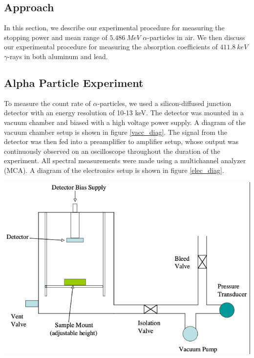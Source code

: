 \documentclass[10pt]{article}
\newenvironment{Figure}
{\par\medskip\noindent\minipage{\linewidth}}
{\endminipage\par\medskip}
\begin{document}
\begin{multicols}{2}
\section{Approach} \label{appr}
In this section, we describe our experimental procedure for measuring the stopping power and mean range of $5.486 \ MeV$ $\alpha$-particles in air.  We then discuss our experimental procedure for measuring the absorption coefficients of $411.8 \ keV$ $\gamma$-rays in both aluminum and lead. 

\subsection{Alpha Particle Experiment} \label{alf_apprch}

To measure the count rate of $\alpha$-particles, we used a silicon-diffused junction detector with an energy resolution of 10-13 keV.  The detector was mounted in a vacuum chamber and biased with a high voltage power supply.  A diagram of the vacuum chamber setup is shown in figure \ref{vacc_diag}.  The signal from the detector was then fed into a preamplifier to amplifier setup, whose output was continuously observed on an oscilloscope throughout the duration of the experiment.  All spectral measurements were made using a multichannel analyzer (MCA).  A diagram of the electronics setup is shown in figure \ref{elec_diag}.

\begin{Figure}
	\includegraphics[width=\textwidth,keepaspectratio]{vacc_diag.png}
\end{Figure} 


\end{multicols}
\end{document}
